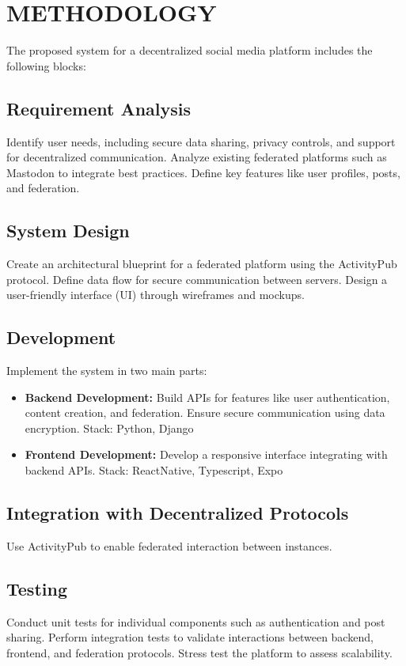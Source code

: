 \chapter{METHODOLOGY}

The proposed system for a decentralized social media platform includes the following blocks:

\section{Requirement Analysis}
Identify user needs, including secure data sharing, privacy controls, and support for decentralized communication. Analyze existing federated platforms such as Mastodon to integrate best practices. Define key features like user profiles, posts, and federation.

\section{System Design}
Create an architectural blueprint for a federated platform using the ActivityPub protocol. Define data flow for secure communication between servers. Design a user-friendly interface (UI) through wireframes and mockups.

\section{Development}
Implement the system in two main parts:
\begin{itemize}
    \item \textbf{Backend Development:} Build APIs for features like user authentication, content creation, and federation. Ensure secure communication using data encryption. Stack: Python, Django
    \item \textbf{Frontend Development:} Develop a responsive interface integrating with backend APIs. Stack: ReactNative, Typescript, Expo
\end{itemize}

\section{Integration with Decentralized Protocols}
Use ActivityPub to enable federated interaction between instances.

\section{Testing}
Conduct unit tests for individual components such as authentication and post sharing. Perform integration tests to validate interactions between backend, frontend, and federation protocols. Stress test the platform to assess scalability.

